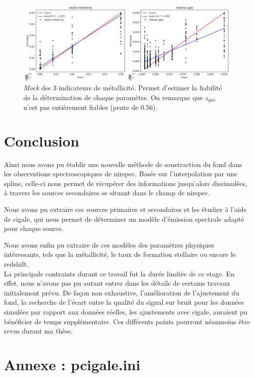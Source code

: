 \documentclass[12pt, a4paper]{article}
\begin{document}
\begin{figure}[H]
  \centering
  \includegraphics[width=1\textwidth]{assets/mock_metallicity.png}
  \caption{\textit{Mock} des 3 indicateurs de métallicité. Permet d'estimer la fiabilité de la détermination de chaque paramètre. On remarque que $z_{gas}$ n'est pas entièrement fiables (pente de $0.56$).}
  \label{fig:mock_metallicity}
\end{figure}


\section{Conclusion}

Ainsi nous avons pu établir une nouvelle méthode de soustraction du fond dans les observations spectroscopiques de \gls{nirspec}. Basée sur l'interpolation par une spline, celle-ci nous permet de récupérer des informations jusqu'alors dissimulées, à travers les sources secondaires se situant dans le champ de \gls{nirspec}.

Nous avons pu extraire ces sources primaires et secondaires et les étudier à l'aide de \gls{cigale}, qui nous permet de déterminer un modèle d'émission spectrale adapté pour chaque source.

Nous avons enfin pu extraire de ces modèles des paramètres physiques intéressants, tels que la métallicité, le taux de formation stellaire ou encore le redshift.\\

La principale contrainte durant ce travail fut la durée limitée de ce stage. En effet, nous n'avons pas pu autant entrer dans les détails de certains travaux initialement prévu. De façon non exhaustive, l'amélioration de l'ajustement du fond, la recherche de l'écart entre la qualité du signal sur bruit pour les données simulées par rapport aux données réelles, les ajustements avec \gls{cigale}, auraient pu bénéficier de temps supplémentaire. Ces différents points pourront néanmoins être revus durant ma thèse.

\newpage

\printnoidxglossaries

\newpage

\printbibliography %

\newpage

\section{Annexe : pcigale.ini}
\label{pcigale.ini}


\end{document}
